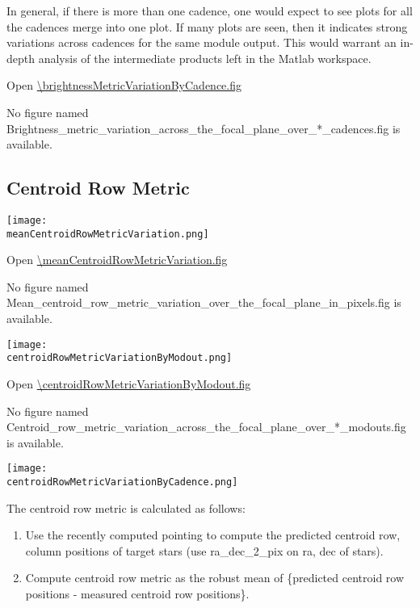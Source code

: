 In general, if there is more than one cadence, one would expect to see
plots for all the cadences merge into one plot. If many plots are
seen, then it indicates strong variations across cadences for the same
module output. This would warrant an in-depth analysis of the
intermediate products left in the Matlab workspace.

Open \url{\brightnessMetricVariationByCadence.fig}

\else
No figure named
Brightness\_metric\_variation\_across\_the\_focal\_plane\_over\_*\_cadences.fig is
available.
\fi
\clearpage

\subsection{Centroid Row Metric}

\ifdefined \meanCentroidRowMetricVariation

\begin{center}
  \texttt{[image: \\meanCentroidRowMetricVariation.png]}
\end{center}

\meanCentroidRowMetricVariationCaption

Open \url{\meanCentroidRowMetricVariation.fig}

\else
No figure named
Mean\_centroid\_row\_metric\_variation\_over\_the\_focal\_plane\_in\_pixels.fig is
available.
\fi
\clearpage

\ifdefined \centroidRowMetricVariationByModout

\begin{center}
  \texttt{[image: \\centroidRowMetricVariationByModout.png]}
\end{center}

\centroidRowMetricVariationByModoutCaption

Open \url{\centroidRowMetricVariationByModout.fig}

\else
No figure named
Centroid\_row\_metric\_variation\_across\_the\_focal\_plane\_over\_*\_modouts.fig is
available.
\fi
\clearpage

\ifdefined \centroidRowMetricVariationByCadence

\begin{center}
  \texttt{[image: \\centroidRowMetricVariationByCadence.png]}
\end{center}

The centroid row metric is calculated as follows: 

\begin{enumerate}
\item 
  Use the recently computed pointing to compute the predicted centroid
  row, column positions of target stars (use ra\_dec\_2\_pix on ra, dec
  of stars).
\item 
  Compute centroid row metric as the robust mean of \{predicted centroid
  row positions - measured centroid row positions\}.
\end{enumerate}

